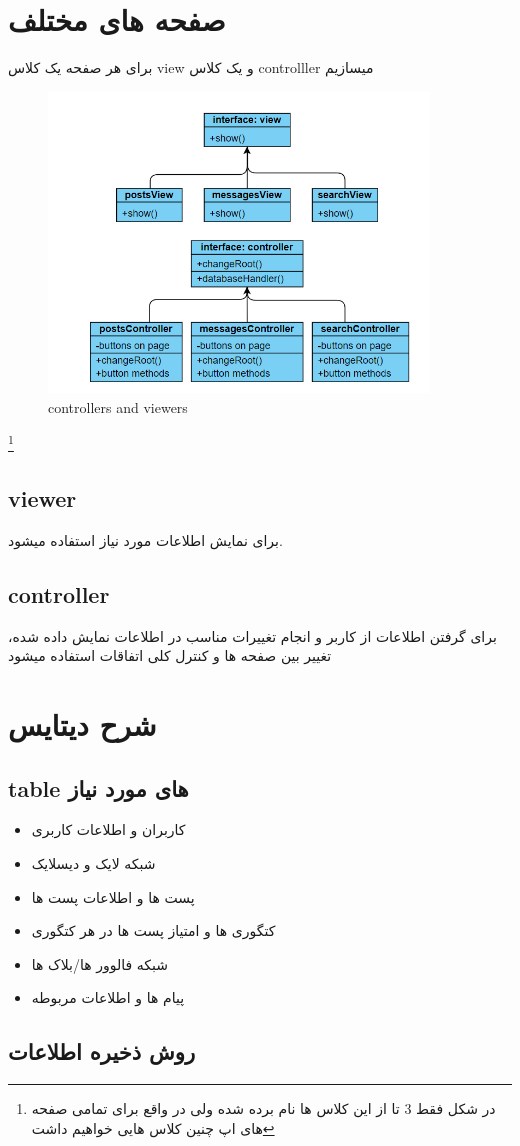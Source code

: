 \documentclass[12pt]{article}
\begin{document}
\section{صفحه های مختلف}
برای هر صفحه یک کلاس view و یک کلاس controlller میسازیم
\begin{figure}[h]
    \centering
    \includegraphics[width = 0.9\textwidth]{2.png}
    \caption{controllers and viewers}
\end{figure}
\footnote{در شکل فقط 3 تا از این کلاس ها نام برده شده
    ولی در واقع برای تمامی صفحه های اپ چنین کلاس
    هایی خواهیم داشت}
\subsection*{viewer}
برای  نمایش  اطلاعات مورد نیاز استفاده میشود.
\subsection*{controller}
برای گرفتن اطلاعات از کاربر و انجام تغییرات مناسب در
اطلاعات نمایش داده شده، تغییر بین صفحه ها و کنترل کلی
اتفاقات استفاده میشود
\pagebreak
\section{شرح دیتایس}
\subsection{table های مورد نیاز}
\begin{itemize}
    \item کاربران و اطلاعات کاربری
    \item شبکه لایک و دیسلایک
    \item پست ها و اطلاعات پست ها
    \item کتگوری ها و امتیاز پست ها در هر کتگوری
    \item شبکه فالوور ها/بلاک ها
    \item پیام ها و اطلاعات مربوطه
\end{itemize}
\subsection{روش ذخیره اطلاعات}
\end{document}
